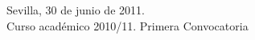 {\vspace*{0.5cm}
\vfill
\begin{center}
{\footnotesize Sevilla, 30 de junio de 2011.\\Curso académico 2010/11. Primera Convocatoria}
\end{center}

%
%
%
%
%
%
%





\newpage
\thispagestyle{empty}
\mbox{ }
\newpage
\thispagestyle{empty}

\newpage
\thispagestyle{empty}

\mbox{ }

\vfill

\begin{flushright}
  \begin{minipage}{9cm}



\end{minipage}
\end{flushright}

\vfill

\newpage
\thispagestyle{empty}
\mbox{ }

}

  
